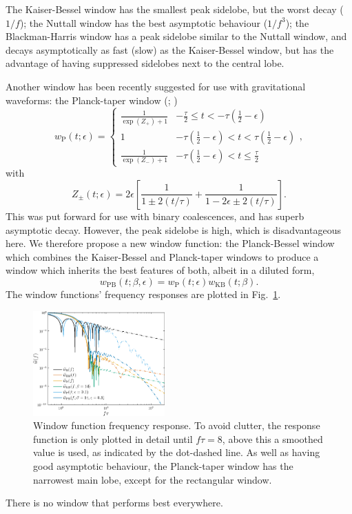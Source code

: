 \documentclass[useAMS,usedcolumn,usegraphicx,usenatbib]{mn2e}
\newcommand{\figref}[1]{Fig.~\ref{fig:#1}}
\newcommand{\sub}[1]{\ensuremath{_\mathrm{#1}}}
\newcommand{\recip}[1]{\ensuremath{\frac{1}{#1}}}
\begin{document}
The Kaiser-Bessel window has the smallest peak sidelobe, but the worst decay ($1/f$); the Nuttall window has the best asymptotic behaviour ($1/f^3$); the Blackman-Harris window has a peak sidelobe similar to the Nuttall window, and decays asymptotically as fast (slow) as the Kaiser-Bessel window, but has the advantage of having suppressed sidelobes next to the central lobe.

Another window has been recently suggested for use with gravitational waveforms: the Planck-taper window (\citealt*{Damour2000}; \citealt{McKechan2010})
\begin{equation}
w\sub{P}(t; \epsilon) = \begin{cases}
 {\displaystyle \recip{\exp(Z_+)+1}} & {\displaystyle -\frac{\tau}{2} \leq t < -\tau\left(\recip{2} - \epsilon\right)} \\
 1 & {\displaystyle -\tau\left(\recip{2} - \epsilon\right) < t < \tau\left(\recip{2} - \epsilon\right)} \\
 {\displaystyle \recip{\exp(Z_-)+1}} & {\displaystyle -\tau\left(\recip{2} - \epsilon\right) < t \leq \frac{\tau}{2}}
\end{cases},
\end{equation}
with
\begin{equation}
Z_\pm(t; \epsilon) = 2\epsilon\left[\recip{1 \pm 2(t/\tau)} + \recip{1 - 2\epsilon \pm 2(t/\tau)}\right].
\end{equation}
This was put forward for use with binary coalescences, and has superb asymptotic decay. However, the peak sidelobe is high, which is disadvantageous here. We therefore propose a new window function: the Planck-Bessel window which combines the Kaiser-Bessel and Planck-taper windows to produce a window which inherits the best features of both, albeit in a diluted form,
\begin{equation}
w\sub{PB}(t;\beta,\epsilon) = w\sub{P}(t; \epsilon)w\sub{KB}(t;\beta).
\end{equation}
The window functions' frequency responses are plotted in \figref{Response}.
\begin{figure}
  \begin{center}
  \includegraphics[width=0.45\textwidth]{Fig_Response}
    \caption{Window function frequency response. To avoid clutter, the response function is only plotted in detail until $f\tau = 8$, above this a smoothed value is used, as indicated by the dot-dashed line. As well as having good asymptotic behaviour, the Planck-taper window has the narrowest main lobe, except for the rectangular window.}
    \label{fig:Response}
  \end{center}
\end{figure}
There is no window that performs best everywhere.
\end{document}

